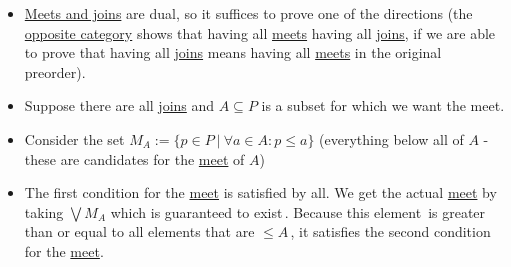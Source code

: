 \begin{itemize}
    \item  \hyperref[D1.81]{Meets and joins} are dual, so it suffices to prove one of the directions (the \hyperref[E2.73]{opposite category} shows that having all \hyperref[D1.81]{meets} having all \hyperref[D1.81]{joins}, if we are able to prove that having all \hyperref[D1.81]{joins} means having all \hyperref[D1.81]{meets} in the original preorder).
    \item Suppose there are all \hyperref[D1.81]{joins} and $A \subseteq P$ is a subset for which we want the meet.
    \item Consider the set $M_A := \{p \in P\ |\ \forall a \in A: p \leq a \}$ (everything below all of $A$ - these are candidates for the \hyperref[D1.81]{meet} of $A$)
    \item The first condition for the \hyperref[D1.81]{meet} is satisfied by all. We get the actual \hyperref[D1.81]{meet} by \,taking $\bigvee M_A$ which is guaranteed to exist\,. Because this element \,is greater than or equal to all elements that are $\leq A$\,, it satisfies the second condition for the \hyperref[D1.81]{meet}.
  \end{itemize}

